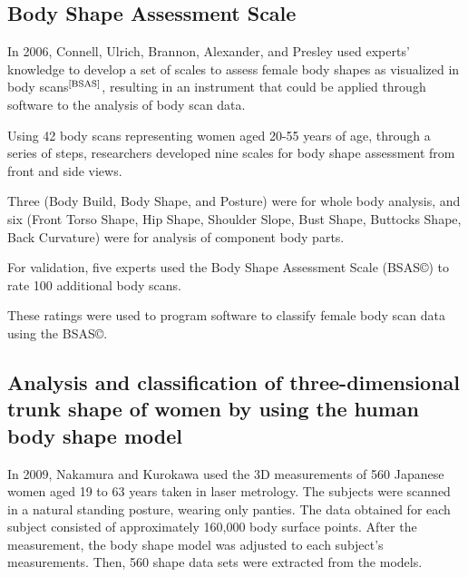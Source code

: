 \documentclass[12pt,a4paper,openany,UKenglish]{scrreprt}
\newcommand{\bib}[1]{$^\text{\cite{#1}}$}
\begin{document}
\subsection{Body Shape Assessment Scale}
In 2006, Connell, Ulrich, Brannon, Alexander, and Presley used experts' knowledge to develop a set of scales to assess female body shapes as visualized in body scans\bib{BSAS}, resulting in an instrument that could be applied through software to the analysis of body scan data.

Using 42 body scans representing women aged 20-55 years of age, through a series of steps, researchers developed nine scales for body shape assessment from front and side views.

Three (Body Build, Body Shape, and Posture) were for whole body analysis, and six (Front Torso Shape, Hip Shape, Shoulder Slope, Bust Shape, Buttocks Shape, Back Curvature) were for analysis of component body parts.

For validation, five experts used the Body Shape Assessment Scale (BSAS\copyright) to rate 100 additional body scans.

These ratings were used to program software to classify female body scan data using the BSAS\copyright.

\subsection{Analysis and classification of three-dimensional trunk shape of women by using the human body shape model}
In 2009, Nakamura and Kurokawa used the 3D measurements of 560 Japanese women aged 19 to 63 years taken in laser metrology.
The subjects were scanned in a natural standing posture, wearing only panties.
The data obtained for each subject consisted of approximately 160,000 body surface points.
After the measurement, the body shape model was adjusted to each subject's measurements.
Then, 560 shape data sets were extracted from the models.
\end{document}
